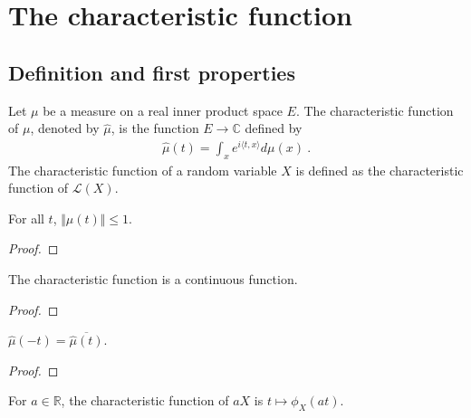 \chapter{The characteristic function}

\section{Definition and first properties}

\begin{definition}\label{def:charFun}
 \leanok
Let $\mu$ be a measure on a real inner product space $E$. The characteristic function of $\mu$, denoted by $\hat{\mu}$, is the function $E \to \mathbb{C}$ defined by
\begin{align*}
\hat{\mu}(t) = \int_x e^{i \langle t, x \rangle} d\mu(x) \: .
\end{align*}
The characteristic function of a random variable $X$ is defined as the characteristic function of $\mathcal L(X)$.
\end{definition}

\begin{lemma}\label{lem:charFun_bounded}
 \leanok
{}
For all $t$, $\Vert\hat{\mu}(t)\Vert \le 1$.
\end{lemma}

\begin{proof}\leanok
\end{proof}

\begin{lemma}\label{lem:charFun_continuous}
The characteristic function is a continuous function.
\end{lemma}

\begin{proof}
\end{proof}

\begin{lemma}\label{lem:charFun_neg}
 \leanok
{}
$\hat{\mu}(-t) = \overline{\hat{\mu}(t)}$.
\end{lemma}

\begin{proof}\leanok
\end{proof}

\begin{lemma}\label{lem:charFun_smul}
For $a \in \mathbb{R}$, the characteristic function of $a X$ is $t \mapsto \phi_X(at)$.
\end{lemma}

